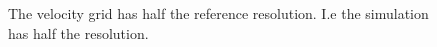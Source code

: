 \begin{figure}[h!]
\centering
{}
\caption
{
\label{fig:fire2}
The velocity grid has half the reference resolution. I.e the simulation has half the resolution.
}
\end{figure} 


